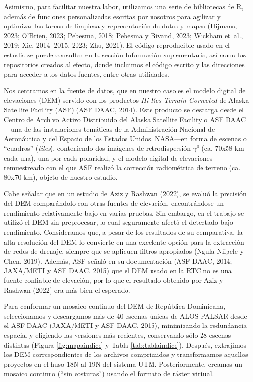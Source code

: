 \documentclass[spanish]{article}
\begin{document}
Asimismo, para facilitar nuestra labor, utilizamos una serie de
bibliotecas de R, además de funciones personalizadas escritas por
nosotros para agilizar y optimizar las tareas de limpieza y
representación de datos y mapas (Hijmans, 2023; O'Brien, 2023; Pebesma,
2018; Pebesma y Bivand, 2023; Wickham et~al., 2019; Xie, 2014, 2015,
2023; Zhu, 2021). El código reproducible usado en el estudio se puede
consultar en la sección \protect\hyperlink{infosupl}{Información
suplementaria}, así como los repositorios creados al efecto, donde
incluimos el código escrito y las direcciones para acceder a los datos
fuentes, entre otras utilidades.

Nos centramos en la fuente de datos, que en nuestro caso es el modelo
digital de elevaciones (DEM) servido con los productos \emph{Hi-Res
Terrain Corrected} de Alaska Satellite Facility (ASF) (ASF DAAC, 2014).
Este producto se descarga desde el Centro de Archivo Activo Distribuido
del Alaska Satellite Facility o ASF DAAC---una de las instalaciones
temáticas de la Administración Nacional de Aeronáutica y del Espacio de
los Estados Unidos, NASA---en forma de escenas o ``cuadros''
(\emph{tiles}), conteniendo dos imágenes de retrodispersión \(\gamma^0\)
(ca. 70x58 km cada una), una por cada polaridad, y el modelo digital de
elevaciones remuestreado con el que ASF realizó la corrección
radiométrica de terreno (ca. 80x70 km), objeto de nuestro estudio.

Cabe señalar que en un estudio de Aziz y Rashwan (2022), se evaluó la
precisión del DEM comparándolo con otras fuentes de elevación,
encontrándose un rendimiento relativamente bajo en varias pruebas. Sin
embargo, en el trabajo se utilizó el DEM sin preprocesar, lo cual
seguramente afectó el detectado bajo rendimiento. Consideramos que, a
pesar de los resultados de su comparativa, la alta resolución del DEM lo
convierte en una excelente opción para la extracción de redes de
drenaje, siempre que se apliquen filtros apropiados (Ngula Niipele y
Chen, 2019). Además, ASF señaló en su documentación (ASF DAAC, 2014;
JAXA/METI y ASF DAAC, 2015) que el DEM usado en la RTC no es una fuente
confiable de elevación, por lo que el resultado obtenido por Aziz y
Rashwan (2022) era más bien el esperado.

Para conformar un mosaico continuo del DEM de República Dominicana,
seleccionamos y descargamos más de 40 escenas únicas de ALOS-PALSAR
desde el ASF DAAC (JAXA/METI y ASF DAAC, 2015), minimizando la
redundancia espacial y eligiendo las versiones más recientes,
conservando sólo 28 escenas distintas (Figura \ref{fig:mapaindice} y
Tabla \ref{tab:tablaindice}). Después, extrajimos los DEM
correspondientes de los archivos comprimidos y transformamos aquellos
proyectos en el huso 18N al 19N del sistema UTM. Posteriormente, creamos
un mosaico continuo (``sin costuras'') usando el formato de ráster
virtual.
\end{document}
